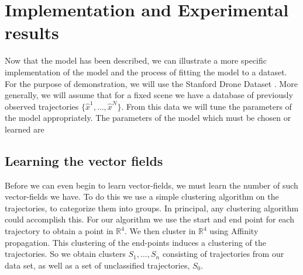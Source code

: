 \documentclass[conference]{IEEEtran}
\begin{document}
%  
  
\section{Implementation and Experimental results} \label{sec:implementation}
  Now that the model has been described, we can illustrate a more specific implementation of the model and the process of fitting the model to a dataset.
  For the purpose of demonstration, we will use the Stanford Drone Dataset \cite{Robicquet2016}.
  More generally, we will assume that for a fixed scene we have a database of previously observed trajectories $\{ \hat{x}^1, \dots, \hat{x}^N\}$.
  From this data we will tune the parameters of the model appropriately.
  The parameters of the model which must be chosen or learned are
  
  \subsection{Learning the vector fields}
  Before we can even begin to learn vector-fields, we must learn the number of such vector-fields we have.
  To do this we use a simple clustering algorithm on the trajectories, to categorize them into groups.
  In principal, any clustering algorithm could accomplish this.
  For our algorithm we use the start and end point for each trajectory to obtain a point in $\mathbb{R}^4$.
  We then cluster in $\mathbb{R}^4$ using Affinity propagation.
  This clustering of the end-points induces a clustering of the trajectories.
  So we obtain clusters $S_1, \dots, S_n$ consisting of trajectories from our data set, as well as a set of unclassified trajectories, $S_0$.
  
\end{document}

